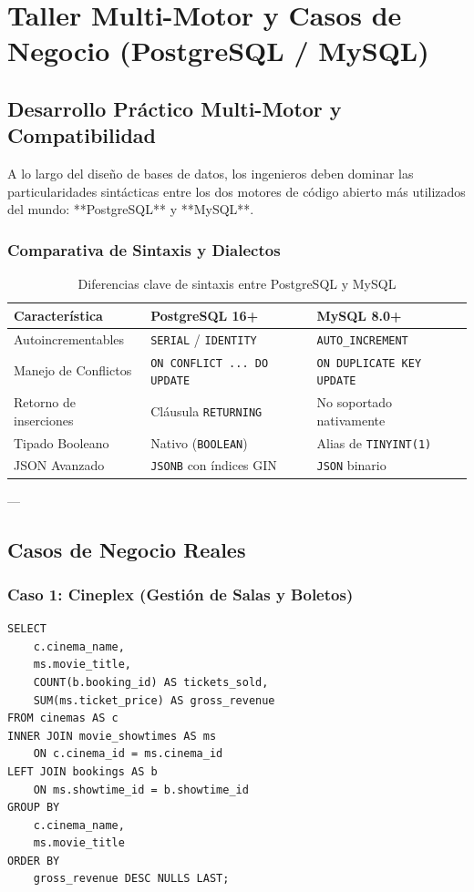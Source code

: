 \chapter{Taller Multi-Motor y Casos de Negocio (PostgreSQL / MySQL)}
\label{chap:lab02_taller_multimotor}

\section{Desarrollo Pr\'actico Multi-Motor y Compatibilidad}

A lo largo del dise\~no de bases de datos, los ingenieros deben dominar las particularidades sint\'acticas entre los dos motores de c\'odigo abierto m\'as utilizados del mundo: **PostgreSQL** y **MySQL**.

\subsection{Comparativa de Sintaxis y Dialectos}
\begin{table}[h!]
\centering
\small
\begin{tabularx}{\textwidth}{lXX}
\toprule
\textbf{Caracter\'istica} & \textbf{PostgreSQL 16+} & \textbf{MySQL 8.0+} \\
\midrule
Autoincrementables & \texttt{SERIAL} / \texttt{IDENTITY} & \texttt{AUTO\_INCREMENT} \\
Manejo de Conflictos & \texttt{ON CONFLICT ... DO UPDATE} & \texttt{ON DUPLICATE KEY UPDATE} \\
Retorno de inserciones & Cl\'ausula \texttt{RETURNING} & No soportado nativamente \\
Tipado Booleano & Nativo (\texttt{BOOLEAN}) & Alias de \texttt{TINYINT(1)} \\
JSON Avanzado & \texttt{JSONB} con \'indices GIN & \texttt{JSON} binario \\
\bottomrule
\end{tabularx}
\caption{Diferencias clave de sintaxis entre PostgreSQL y MySQL}
\end{table}

---

\section{Casos de Negocio Reales}

\subsection{Caso 1: Cineplex (Gesti\'on de Salas y Boletos)}
\begin{lstlisting}[style=sqlstyle, caption={Consulta de recaudaci\'on por sala de cine}]
SELECT
    c.cinema_name,
    ms.movie_title,
    COUNT(b.booking_id) AS tickets_sold,
    SUM(ms.ticket_price) AS gross_revenue
FROM cinemas AS c
INNER JOIN movie_showtimes AS ms
    ON c.cinema_id = ms.cinema_id
LEFT JOIN bookings AS b
    ON ms.showtime_id = b.showtime_id
GROUP BY
    c.cinema_name,
    ms.movie_title
ORDER BY
    gross_revenue DESC NULLS LAST;
\end{lstlisting}
